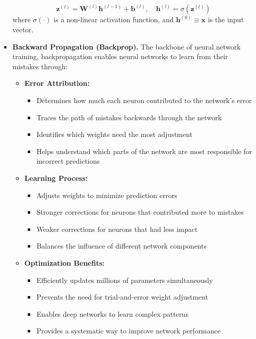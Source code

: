 \begin{itemize}
    \begin{equation}\label{eq:forward_prop}
        \mathbf{z}^{(l)} = \mathbf{W}^{(l)} \mathbf{h}^{(l-1)} + \mathbf{b}^{(l)}, \quad \mathbf{h}^{(l)} = \sigma(\mathbf{z}^{(l)})
    \end{equation}
    where $\sigma(\cdot)$ is a non-linear activation function, and $\mathbf{h}^{(0)} \equiv \mathbf{x}$ is the input vector.

    \item \textbf{Backward Propagation (Backprop).} The backbone of neural network training, backpropagation enables neural networks to learn from their mistakes through:
    \begin{itemize}
        \item \textbf{Error Attribution:}
            \begin{itemize}
                \item Determines how much each neuron contributed to the network's error
                \item Traces the path of mistakes backwards through the network
                \item Identifies which weights need the most adjustment
                \item Helps understand which parts of the network are most responsible for incorrect predictions
            \end{itemize}
            
        \item \textbf{Learning Process:}
            \begin{itemize}
                \item Adjusts weights to minimize prediction errors
                \item Stronger corrections for neurons that contributed more to mistakes
                \item Weaker corrections for neurons that had less impact
                \item Balances the influence of different network components
            \end{itemize}
            
        \item \textbf{Optimization Benefits:}
            \begin{itemize}
                \item Efficiently updates millions of parameters simultaneously
                \item Prevents the need for trial-and-error weight adjustment
                \item Enables deep networks to learn complex patterns
                \item Provides a systematic way to improve network performance
            \end{itemize}
            

\end{itemize}
\end{itemize}
